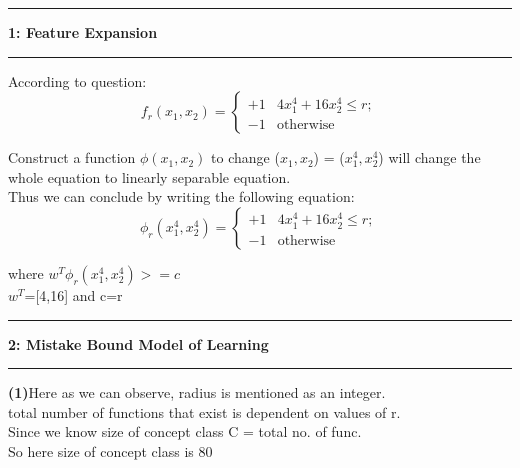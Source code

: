 \documentclass[11pt]{article}
\newcommand\question[2]{\vspace{.25in}\hrule\textbf{#1: #2}\vspace{.5em}\hrule\vspace{.10in}}
\renewcommand\part[1]{\vspace{.10in}\textbf{(#1)}}
\begin{document}
\raggedright
\newcommand\NAME{Aishwarya Asesh}  %
\newcommand\UID{u1063384}     %
\newcommand\HWNUM{2}              %



\question{1}{Feature Expansion}
According to question:
\begin{equation}
f_r(x_1, x_2) = \left\{
    \begin{array}{rl}
      +1 & 4x_1^4 + 16x_2^4 \leq r;\\
      -1 & \mbox{otherwise}
    \end{array}
\right.
\label{eq:f_r}
\end{equation}

Construct a function $\phi(x_1, x_2)$ to change ($x_1,x_2$) = ($x_{1}^4,x_{2}^4$) will change the whole equation to linearly separable equation. 
\\ Thus we can conclude by writing the following equation:
\\
\begin{equation}
\phi_r(x_{1}^4,x_{2}^4) = \left\{
    \begin{array}{rl}
      +1 & 4x_1^4 + 16x_2^4 \leq r;\\
      -1 & \mbox{otherwise}
    \end{array}
\right.
\label{eq:f_r}
\end{equation}
 
where $w^{T}$$\phi_r(x_{1}^4,x_{2}^4)$$>=c$
\\$w^{T}$=[4,16] and c=r



\question{2}{Mistake Bound Model of Learning} 
\part{1}Here as we can observe, radius is mentioned as an integer.
\\total number of functions that exist is dependent on values of r.
\\ Since we know size of concept class C = total no. of func.
\\ So here size of concept class is 80\\
\end{document}
